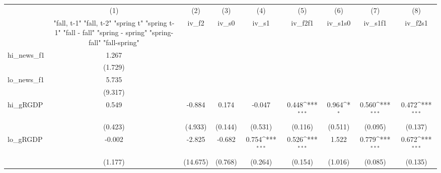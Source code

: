 {
\def\sym#1{\ifmmode^{#1}\else\(^{#1}\)\fi}
\begin{tabular}{l*{8}{c}}
\toprule
            &\multicolumn{1}{c}{(1)}&\multicolumn{1}{c}{(2)}&\multicolumn{1}{c}{(3)}&\multicolumn{1}{c}{(4)}&\multicolumn{1}{c}{(5)}&\multicolumn{1}{c}{(6)}&\multicolumn{1}{c}{(7)}&\multicolumn{1}{c}{(8)}\\
            &\multicolumn{1}{c}{  "fall, t-1" "fall, t-2" "spring t" "spring t-1"  "fall - fall" "spring - spring" "spring-fall" "fall-spring" }&\multicolumn{1}{c}{iv\_f2}&\multicolumn{1}{c}{iv\_s0}&\multicolumn{1}{c}{iv\_s1}&\multicolumn{1}{c}{iv\_f2f1}&\multicolumn{1}{c}{iv\_s1s0}&\multicolumn{1}{c}{iv\_s1f1}&\multicolumn{1}{c}{iv\_f2s1}\\
\midrule
hi\_news\_f1  &       1.267         &                     &                     &                     &                     &                     &                     &                     \\
            &     (1.729)         &                     &                     &                     &                     &                     &                     &                     \\
\addlinespace
lo\_news\_f1  &       5.735         &                     &                     &                     &                     &                     &                     &                     \\
            &     (9.317)         &                     &                     &                     &                     &                     &                     &                     \\
\addlinespace
hi\_gRGDP    &       0.549         &      -0.884         &       0.174         &      -0.047         &       0.448\sym{***}&       0.964\sym{*}  &       0.560\sym{***}&       0.472\sym{***}\\
            &     (0.423)         &     (4.933)         &     (0.144)         &     (0.531)         &     (0.116)         &     (0.511)         &     (0.095)         &     (0.137)         \\
\addlinespace
lo\_gRGDP    &      -0.002         &      -2.825         &      -0.682         &       0.754\sym{***}&       0.526\sym{***}&       1.522         &       0.779\sym{***}&       0.672\sym{***}\\
            &     (1.177)         &    (14.675)         &     (0.768)         &     (0.264)         &     (0.154)         &     (1.016)         &     (0.085)         &     (0.135)         \\

\end{tabular}}
